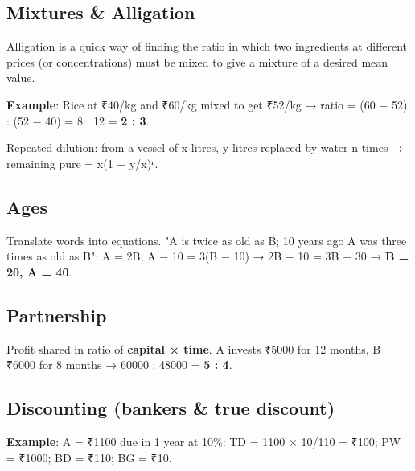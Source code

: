 \needspace{125pt}

\hypertarget{p1-05--62-mixtures--alligation}{%
\subsection{Mixtures \& Alligation}\label{p1-05--62-mixtures--alligation}}

Alligation is a quick way of finding the ratio in which two ingredients at different prices (or
concentrations) must be mixed to give a mixture of a desired mean value.



\textbf{Example}: Rice at ₹40/kg and ₹60/kg mixed to get ₹52/kg → ratio = (60 − 52) : (52 − 40) = 8 : 12 = \textbf{2 : 3}.

Repeated dilution: from a vessel of x litres, y litres replaced by water n times → remaining pure = x(1 − y/x)ⁿ.

\needspace{227pt}

\hypertarget{p1-05--63-ages}{%
\subsection{Ages}\label{p1-05--63-ages}}

Translate words into equations. "A is twice as old as B; 10 years ago A was three times as old as B":
A = 2B, A − 10 = 3(B − 10) → 2B − 10 = 3B − 30 → \textbf{B = 20, A = 40}.

\needspace{161pt}

\hypertarget{p1-05--64-partnership}{%
\subsection{Partnership}\label{p1-05--64-partnership}}

Profit shared in ratio of \textbf{capital × time}. A invests ₹5000 for 12 months, B ₹6000 for 8 months → 60000 : 48000 = \textbf{5 : 4}.

\needspace{95pt}

\hypertarget{p1-05--65-discounting-bankers--true-discount}{%
\subsection{Discounting (banker\textquotesingle s \& true discount)}\label{p1-05--65-discounting-bankers--true-discount}}



\textbf{Example}: A = ₹1100 due in 1 year at 10\%: TD = 1100 × 10/110 = ₹100; PW = ₹1000; BD = ₹110; BG = ₹10.

